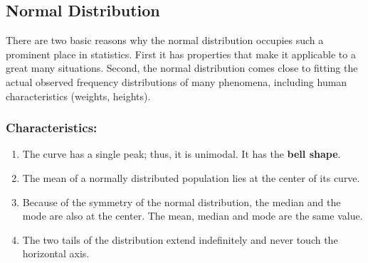 \documentclass[aima331_lecturenotes_ku.tex]{subfiles}
\begin{document}
\subsection{Normal Distribution}
There are two basic reasons why the normal distribution occupies such a prominent place in statistics. First it has properties that make it applicable to a great many situations. Second, the normal distribution comes close to fitting the actual observed frequency distributions of many phenomena, including human characteristics (weights, heights).

\subsubsection{Characteristics:}
\begin{enumerate}
\item The curve has a single peak; thus, it is unimodal. It has the \textbf{bell shape}.
\item The mean of a normally distributed population lies at the center of its curve.
\item Because of the symmetry of the normal distribution, the median and the mode are also at the center. The mean, median and mode are the same value.
\item The two tails of the distribution extend indefinitely and never touch the horizontal axis.
\end{enumerate}
\end{document}

